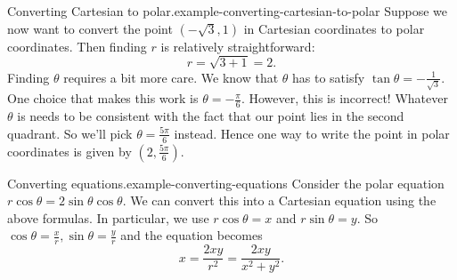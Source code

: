 \documentclass[10pt,]{book}
\numberwithin{equation}{section}
\begin{document}
\begin{example}{Converting Cartesian to polar.}{example-converting-cartesian-to-polar}%
\hypertarget{p-1024}{}%
Suppose we now want to convert the point \((-\sqrt{3},1)\) in Cartesian coordinates to polar coordinates. Then finding \(r\) is relatively straightforward:%
%
\begin{equation*}
r = \sqrt{3+1} = 2.
\end{equation*}
\hypertarget{p-1025}{}%
Finding \(\theta\) requires a bit more care. We know that \(\theta\) has to satisfy \(\tan\theta = -\frac{1}{\sqrt{3}}\). One choice that makes this work is \(\theta = -\frac{\pi}{6}\). However, this is incorrect! Whatever \(\theta\) is needs to be consistent with the fact that our point lies in the second quadrant. So we'll pick \(\theta = \frac{5\pi}{6}\) instead. Hence one way to write the point in polar coordinates is given by \((2,\frac{5\pi}{6}).\)%
\end{example}
\begin{example}{Converting equations.}{example-converting-equations}%
\hypertarget{p-1026}{}%
Consider the polar equation \(r\cos\theta = 2\sin\theta\cos\theta\). We can convert this into a Cartesian equation using the above formulas. In particular, we use \(r\cos\theta = x\) and \(r\sin\theta = y\). So \(\cos\theta = \frac{x}{r}, \sin\theta = \frac{y}{r}\) and the equation becomes%
%
\begin{equation*}
x = \frac{2xy}{r^{2}} = \frac{2xy}{x^{2}+y^{2}}.
\end{equation*}
\end{example}
%
%
\typeout{************************************************}
\typeout{************************************************}
%
\end{document}
